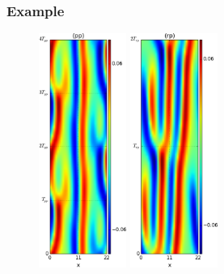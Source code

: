 \documentclass[mathserif, handout]{beamer}
\begin{document}
\begin{frame}
  \frametitle{Example}
  \begin{figure}[h]
    \centering
    \includegraphics[width=0.255\textwidth]{KSppo1State}
    \includegraphics[width=0.255\textwidth]{KSrpo1State}
  \end{figure}
\end{frame}
\end{document}
